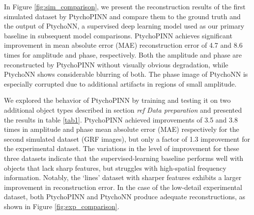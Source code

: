 \documentclass[sn-mathphys]{sn-jnl}%
\theoremstyle{thmstyleone}%
\theoremstyle{thmstyletwo}%
\theoremstyle{thmstylethree}%
\begin{document}
In Figure \ref{fig:sim_comparison}, we present the reconstruction results of the first simulated dataset by PtychoPINN and compare them to the ground truth and the output of PtychoNN, a supervised deep learning model used as our primary baseline in subsequent model comparisons. PtychoPINN achieves significant improvement in mean absolute error (MAE) reconstruction error of 4.7 and 8.6 times for amplitude and phase, respectively. Both the amplitude and phase are reconstructed by PtychoPINN without visually obvious degradation, while PtychoNN shows considerable blurring of both. The phase image of PtychoNN is especially corrupted due to additional artifacts in regions of small amplitude.


We explored the behavior of PtychoPINN by training and testing it on two additional object types described in section \emph{ref Data preparation} and presented the results in table \ref{tab1}. PtychoPINN achieved improvements of 3.5 and 3.8 times in amplitude and phase mean absolute error (MAE) respectively for the second simulated dataset (GRF images), but only a factor of 1.3 improvement for the experimental dataset. The variations in the level of improvement for these three datasets indicate that the supervised-learning baseline performs well with objects that lack sharp features, but struggles with high-spatial frequency information. Notably, the `lines' dataset with sharper features exhibits a larger improvement in reconstruction error. In the case of the low-detail experimental dataset, both PtychoPINN and PtychoNN produce adequate reconstructions, as shown in Figure \ref{fig:exp_comparison}.
\end{document}
